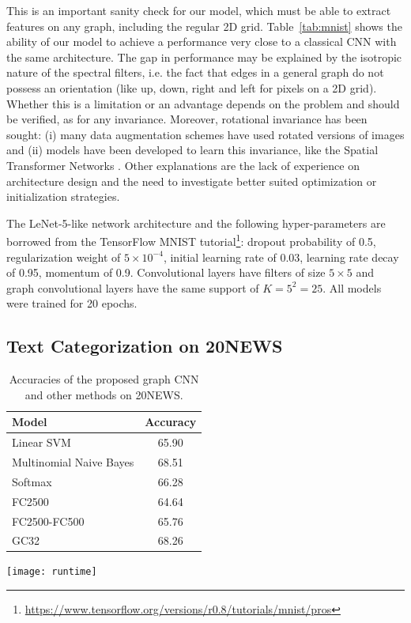 \documentclass{article}
\newcommand{\tabref}[1]{Table~\ref{tab:#1}}
\newcommand{\todo}[1]{{\color{red} #1 }}
\begin{document}
This is an important sanity check for our model, which must be able to extract
features on any graph, including the regular 2D grid. \tabref{mnist} shows the
ability of our model to achieve a performance very close to a classical CNN
with the same architecture. The gap in performance may be explained by the
isotropic nature of the spectral filters, i.e. the fact that edges in a general
graph do not possess an orientation (like up, down, right and left for pixels
on a 2D grid). Whether this is a limitation or an advantage depends on the
problem and should be verified, as for any invariance. Moreover, rotational
invariance has been sought: (i) many data augmentation schemes have used
rotated versions of images and (ii) models have been developed to learn this
invariance, like the Spatial Transformer Networks \cite{jaderberg2015spatial}.
Other explanations are the lack of experience on architecture design and the
need to investigate better suited optimization or initialization strategies.

The LeNet-5-like network architecture and the following hyper-parameters are
borrowed from the TensorFlow MNIST tutorial\footnote{
\url{https://www.tensorflow.org/versions/r0.8/tutorials/mnist/pros}}: dropout
probability of 0.5, regularization weight of $5\times10^{-4}$, initial learning
rate of 0.03, learning rate decay of 0.95, momentum of 0.9. Convolutional layers
have filters of size $5 \times 5$ and graph convolutional layers have the same
support of $K = 5^2 = 25$. All models were trained for 20 epochs.

\subsection{Text Categorization on 20NEWS}

\begin{table}[t]
\begin{minipage}[b]{0.42\linewidth}
	\centering
	\begin{tabular}[b]{lc}
		\toprule
		Model & Accuracy \\
		\midrule
		Linear SVM & 65.90 \\
		Multinomial Naive Bayes & 68.51 \\
		Softmax & 66.28 \\
		\addlinespace
		FC2500 & 64.64 \\
		FC2500-FC500 & 65.76 \\
		\addlinespace
		GC32 & 68.26 \\
		\bottomrule
	\end{tabular}
	\caption{Accuracies of the proposed graph CNN and other
	methods on 20NEWS.} 
	\label{tab:20news}
\end{minipage}
\hfill
\begin{minipage}[b]{0.55\linewidth}
	\centering
	\texttt{[image: runtime]}
	\label{fig:runtime}
\end{minipage}
\end{table}
\end{document}
